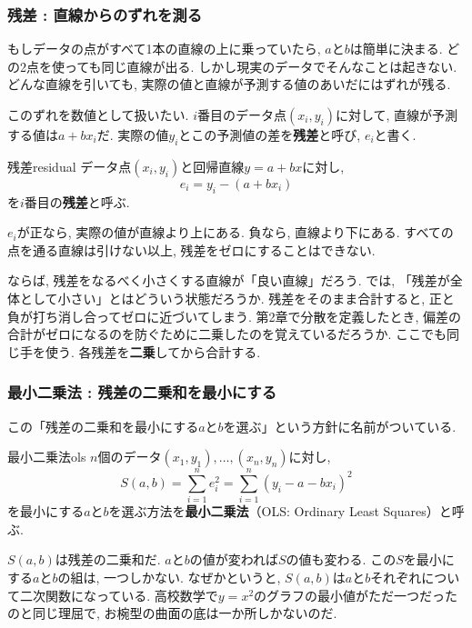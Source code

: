 \subsubsection*{残差 : 直線からのずれを測る}

もしデータの点がすべて1本の直線の上に乗っていたら, $a$と$b$は簡単に決まる.
どの2点を使っても同じ直線が出る.
しかし現実のデータでそんなことは起きない.
どんな直線を引いても, 実際の値と直線が予測する値のあいだにはずれが残る.

このずれを数値として扱いたい.
$i$番目のデータ点$(x_i, y_i)$に対して, 直線が予測する値は$a + bx_i$だ.
実際の値$y_i$とこの予測値の差を\textbf{残差}と呼び, $e_i$と書く.

\begin{defi}{残差}{residual}
データ点$(x_i, y_i)$と回帰直線$y = a + bx$に対し,
\[
  e_i = y_i - (a + bx_i)
\]
を$i$番目の\textbf{残差}と呼ぶ.
\end{defi}

$e_i$が正なら, 実際の値が直線より上にある.
負なら, 直線より下にある.
すべての点を通る直線は引けない以上, 残差をゼロにすることはできない.

ならば, 残差をなるべく小さくする直線が「良い直線」だろう.
では, 「残差が全体として小さい」とはどういう状態だろうか.
残差をそのまま合計すると, 正と負が打ち消し合ってゼロに近づいてしまう.
第2章で分散を定義したとき, 偏差の合計がゼロになるのを防ぐために二乗したのを覚えているだろうか.
ここでも同じ手を使う.
各残差を\textbf{二乗}してから合計する.

\subsubsection*{最小二乗法 : 残差の二乗和を最小にする}

この「残差の二乗和を最小にする$a$と$b$を選ぶ」という方針に名前がついている.

\begin{defi}{最小二乗法}{ols}
$n$個のデータ$(x_1, y_1), \ldots, (x_n, y_n)$に対し,
\[
  S(a, b) = \sum_{i=1}^{n} e_i^2 = \sum_{i=1}^{n} (y_i - a - bx_i)^2
\]
を最小にする$a$と$b$を選ぶ方法を\textbf{最小二乗法}（OLS: Ordinary Least Squares）と呼ぶ.
\end{defi}

$S(a, b)$は残差の二乗和だ.
$a$と$b$の値が変われば$S$の値も変わる.
この$S$を最小にする$a$と$b$の組は, 一つしかない.
なぜかというと, $S(a, b)$は$a$と$b$それぞれについて二次関数になっている.
高校数学で$y = x^2$のグラフの最小値がただ一つだったのと同じ理屈で, お椀型の曲面の底は一か所しかないのだ.

